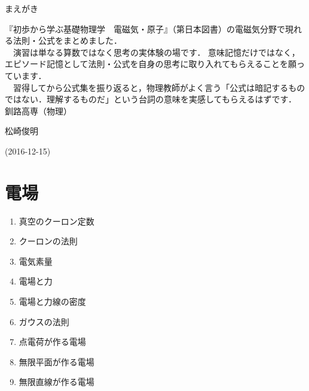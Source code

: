 \documentclass[10pt]{jarticle}
\begin{document}
\addtocounter{page}{-1}
\thispagestyle{empty}

まえがき\\

{\scriptsize
『初歩から学ぶ基礎物理学　電磁気・原子』（第日本図書）の電磁気分野で現れる法則・公式をまとめました．\\

　演習は単なる算数ではなく思考の実体験の場です．
意味記憶だけではなく，エピソード記憶として法則・公式を自身の思考に取り入れてもらえることを願っています．\\

　習得してから公式集を振り返ると，物理教師がよく言う「公式は暗記するものではない．理解するものだ」という台詞の意味を実感してもらえるはずです．\\



\hfill
釧路高専（物理）

\hfill
松崎俊明

\vfill
\hfill
(2016-12-15)
}



\addtocounter{page}{-1}
\thispagestyle{empty}
\tableofcontents



\newpage
\addtocounter{page}{-1}
\thispagestyle{empty}
\section{電場}

\begin{enumerate}
\small
\itemsep-4mm
\item 真空のクーロン定数 \\
\item クーロンの法則 \\
\item 電気素量 \\
\item 電場と力 \\
\item 電場と力線の密度 \\
\item ガウスの法則 \\
\item 点電荷が作る電場 \\
\item 無限平面が作る電場 \\
\item 無限直線が作る電場 \\
\end{enumerate}
\end{document}
